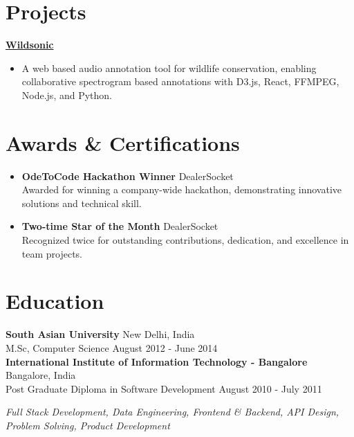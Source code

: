 \documentclass[11pt,a4paper]{article}
\begin{document}
\section*{Projects}
\textbf{\href{https://wildsonic.ai/}{Wildsonic}}
\begin{itemize}[leftmargin=*]
  \item A web based audio annotation tool for wildlife conservation, enabling collaborative spectrogram based annotations with D3.js, React, FFMPEG, Node.js, and Python.
\end{itemize}

\section*{Awards \& Certifications}
\begin{itemize}[leftmargin=*]
  \item \textbf{OdeToCode Hackathon Winner} \hfill DealerSocket\\
    Awarded for winning a company-wide hackathon, demonstrating innovative solutions and technical skill.
  \item \textbf{Two-time Star of the Month} \hfill DealerSocket\\
    Recognized twice for outstanding contributions, dedication, and excellence in team projects.
\end{itemize}

\section*{Education}
\textbf{South Asian University} \hfill New Delhi, India\\
M.Sc, Computer Science \hfill August 2012 - June 2014 \\
\textbf{International Institute of Information Technology - Bangalore} \hfill Bangalore, India\\
Post Graduate Diploma in Software Development \hfill August 2010 - July 2011

\begin{center}
  \fontsize{6pt}{7pt}\selectfont
  \textit{Full Stack Development, Data Engineering, Frontend \& Backend, API Design, Problem Solving, Product Development}
\end{center}
\end{document}
